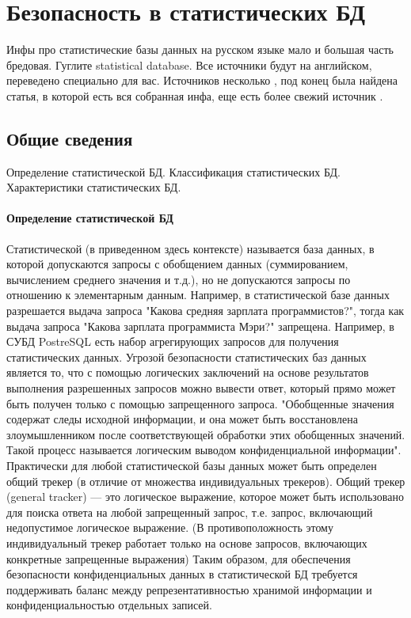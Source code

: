 \section{Безопасность в статистических БД}

Инфы про статистические базы данных на русском языке мало и большая часть бредовая. Гуглите statistical database. Все источники будут на английском, переведено специально для вас. Источников несколько \cite{ComputerSecurity2008} \cite{IntroBD2014}, под конец была найдена статья, \cite{SDB1989} в которой есть вся собранная инфа, еще есть более свежий источник \citep{SDB1999}.

\subsection{Общие сведения}
Определение статистической БД. Классификация статистических БД. Характеристики статистических БД.

\paragraph{Определение статистической БД}
Статистической (в приведенном здесь контексте) называется база данных, в которой допускаются запросы с обобщением данных (суммированием, вычислением среднего значения и т.д.), но не допускаются запросы по отношению к элементарным данным. Например, в статистической базе данных разрешается выдача запроса "Какова средняя зарплата программистов?", тогда как выдача запроса "Какова зарплата программиста Мэри?" запрещена. Например, в СУБД PostreSQL есть набор агрегирующих запросов для получения статистических данных.
Угрозой безопасности статистических баз данных является то, что с помощью логических заключений на основе результатов выполнения разрешенных запросов можно вывести ответ, который прямо может быть получен только с помощью запрещенного запроса. "Обобщенные значения содержат следы исходной информации, и она может быть восстановлена злоумышленником после соответствующей обработки этих обобщенных значений. Такой процесс называется логическим выводом конфиденциальной информации".
Практически для любой статистической базы данных может быть определен общий трекер (в отличие от множества индивидуальных трекеров). Общий трекер (general tracker) — это логическое выражение, которое может быть использовано для поиска ответа на любой запрещенный запрос, т.е. запрос, включающий недопустимое логическое выражение. (В противоположность этому индивидуальный трекер работает только на основе запросов, включающих конкретные запрещенные выражения)
Таким образом, для обеспечения безопасности конфиденциальных данных в статистической БД требуется поддерживать баланс между репрезентативностью хранимой информации и конфиденциальностью отдельных записей.

